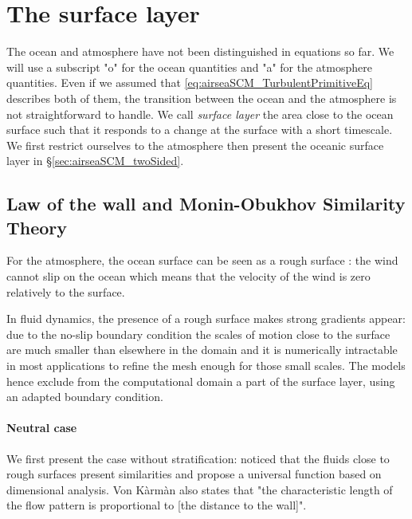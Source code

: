 \section{The surface layer}
\label{sec:airseaSCM_SL}
The ocean and atmosphere have not been distinguished in equations so far.
We will use a subscript "o" for the ocean quantities and "a" for the
atmosphere quantities.
Even if we assumed that \eqref{eq:airseaSCM_TurbulentPrimitiveEq}
describes both of them, the transition between the ocean and the
atmosphere is not straightforward to handle.
We call \textit{surface layer} the area close to the ocean surface
such that it responds to a change at the surface with a short
timescale.
We first restrict ourselves to the atmosphere then
present the oceanic surface layer in \S \ref{sec:airseaSCM_twoSided}.
\subsection{Law of the wall and Monin-Obukhov Similarity Theory}
For the atmosphere, the ocean surface can be seen as a
rough surface : the wind cannot slip on the ocean which
means that the velocity of the wind is zero
relatively to the surface.
\par
{}
\par
In fluid dynamics, the presence of a rough surface makes strong
gradients appear:
due to the no-slip boundary condition
the scales of motion close to the surface are much smaller than
elsewhere in the domain and it is numerically
intractable in most applications
to refine the mesh enough for those small scales.
The models hence exclude from the computational domain
a part of the surface layer, using an adapted boundary
condition.
%
\paragraph{Neutral case}
We first present the case without stratification:
\citep{karman_mechanische_1930} noticed that the
fluids close to rough surfaces present similarities and
propose a universal function based on dimensional analysis.
Von Kàrmàn also states that "the characteristic length
of the flow pattern is proportional to
[the distance to the wall]".

